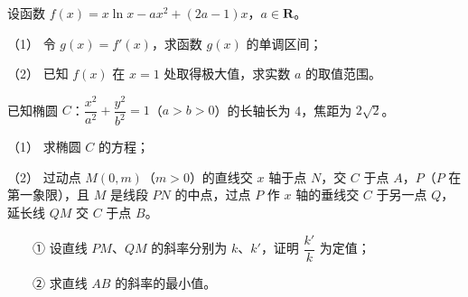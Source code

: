 \begin{question}
设函数 \(f(x)=x\ln x-ax^2+(2a-1)x\)，\(a\in\mathbf{R}\)。

（1） 令 \(g(x)=f'(x)\)，求函数 \(g(x)\) 的单调区间；

（2） 已知 \(f(x)\) 在 \(x=1\) 处取得极大值，求实数 \(a\) 的取值范围。

\Needspace{0.4\textheight}
\end{question}
\begin{question}
已知椭圆 \(C\)：\(\dfrac{x^2}{a^2}+\dfrac{y^2}{b^2}=1\)（\(a>b>0\)）的长轴长为 4，焦距为 \(2\sqrt{2}\)。

（1） 求椭圆 \(C\) 的方程；

（2） 过动点 \(M(0,m)\)（\(m>0\)）的直线交 \(x\) 轴于点 \(N\)，交 \(C\) 于点 \(A\)，\(P\)（\(P\) 在第一象限），且 \(M\) 是线段 \(PN\) 的中点，过点 \(P\) 作 \(x\) 轴的垂线交 \(C\) 于另一点 \(Q\)，延长线 \(QM\) 交 \(C\) 于点 \(B\)。

　　① 设直线 \(PM\)、\(QM\) 的斜率分别为 \(k\)、\(k'\)，证明 \(\dfrac{k'}{k}\) 为定值；

　　② 求直线 \(AB\) 的斜率的最小值。
\nopagebreak[4]
\begin{center}\end{center}
\nopagebreak[4]

\end{question}